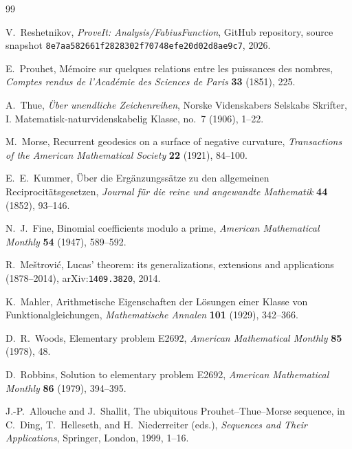 \documentclass[11pt,oneside]{article}
\numberwithin{equation}{section}
\theoremstyle{definition}
\theoremstyle{remark}
\begin{document}
\begin{thebibliography}{99}

V.~Reshetnikov,
\newblock \emph{ProveIt: Analysis/FabiusFunction},
\newblock GitHub repository, source snapshot
\nolinkurl{8e7aa582661f2828302f70748efe20d02d8ae9c7}, 2026.

E.~Prouhet,
\newblock M\'emoire sur quelques relations entre les puissances des nombres,
\newblock \emph{Comptes rendus de l'Acad\'emie des Sciences de Paris}
\textbf{33} (1851), 225.

A.~Thue,
\newblock \emph{\"Uber unendliche Zeichenreihen},
\newblock Norske Videnskabers Selskabs Skrifter, I. Matematisk-naturvidenskabelig
Klasse, no.~7 (1906), 1--22.

M.~Morse,
\newblock Recurrent geodesics on a surface of negative curvature,
\newblock \emph{Transactions of the American Mathematical Society}
\textbf{22} (1921), 84--100.

E.~E.~Kummer,
\newblock \"Uber die Erg\"anzungss\"atze zu den allgemeinen
Reciprocit\"atsgesetzen,
\newblock \emph{Journal f\"ur die reine und angewandte Mathematik}
\textbf{44} (1852), 93--146.

N.~J.~Fine,
\newblock Binomial coefficients modulo a prime,
\newblock \emph{American Mathematical Monthly} \textbf{54} (1947), 589--592.

R.~Me\v{s}trovi\'c,
\newblock Lucas' theorem: its generalizations, extensions and applications
(1878--2014),
\newblock arXiv:\nolinkurl{1409.3820}, 2014.

K.~Mahler,
\newblock Arithmetische Eigenschaften der L\"osungen einer Klasse von
Funktionalgleichungen,
\newblock \emph{Mathematische Annalen} \textbf{101} (1929), 342--366.

D.~R.~Woods,
\newblock Elementary problem E2692,
\newblock \emph{American Mathematical Monthly} \textbf{85} (1978), 48.

D.~Robbins,
\newblock Solution to elementary problem E2692,
\newblock \emph{American Mathematical Monthly} \textbf{86} (1979), 394--395.

J.-P.~Allouche and J.~Shallit,
\newblock The ubiquitous Prouhet--Thue--Morse sequence,
\newblock in C.~Ding, T.~Helleseth, and H.~Niederreiter (eds.),
\emph{Sequences and Their Applications}, Springer, London, 1999, 1--16.


\end{thebibliography}
\end{document}
